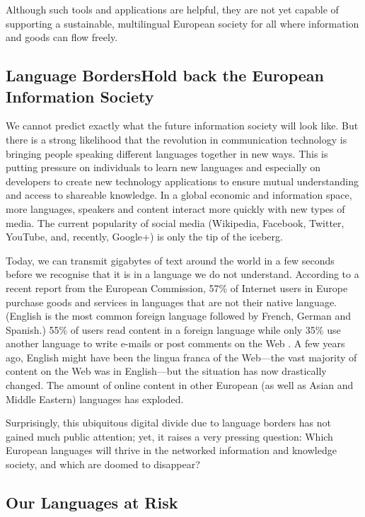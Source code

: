 \begin{multicols}{2}
Although such tools and applications are helpful, they are not yet capable of supporting a sustainable, multilingual European society for all where information and goods can flow freely. 

\subsection[Language Borders Hold back the European Information Society]{Language Borders\newline Hold back the European Information Society}

We cannot predict exactly what the future information society will look like. But there is a strong likelihood that the revolution in communication technology is bringing people speaking different languages together in new ways. This is putting pressure on individuals to learn new languages and especially on developers to create new technology applications to ensure mutual understanding and access to shareable knowledge. In a global economic and information space, more languages, speakers and content interact more quickly with new types of media. The current popularity of social media (Wikipedia, Facebook, Twitter, YouTube, and, recently, Google+) is only the tip of the iceberg.

Today, we can transmit gigabytes of text around the world in a few seconds before we recognise that it is in a language we do not understand. According to a recent report from the European Commission, 57\% of Internet users in Europe purchase goods and services in languages that are not their native language. (English is the most common foreign language followed by French, German and Spanish.) 55\% of users read content in a foreign language while only 35\% use another language to write e-mails or post comments on the Web \cite{EC1}. A few years ago, English might have been the lingua franca of the Web—the vast majority of content on the Web was in English—but the situation has now drastically changed. The amount of online content in other European (as well as Asian and Middle Eastern) languages has exploded.

Surprisingly, this ubiquitous digital divide due to language borders has not gained much public attention; yet, it raises a very pressing question: Which European languages will thrive in the networked information and knowledge society, and which are doomed to disappear?

\subsection{Our Languages at Risk}


\end{multicols}
